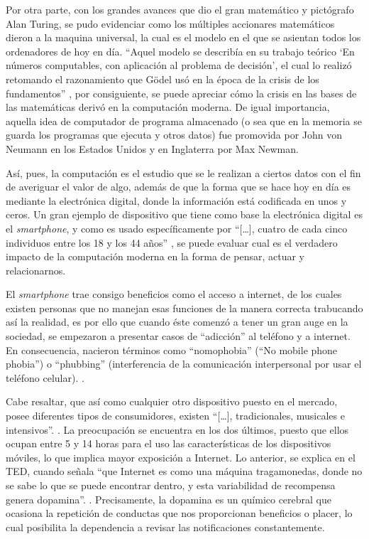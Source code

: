 \documentclass[letterpaper, 12 pt, conference]{ieeeconf}  %
\begin{document}
\begin{.}
Por otra parte, con los grandes avances que dio el gran matemático y pictógrafo Alan Turing, se pudo evidenciar como los múltiples accionares matemáticos dieron a la maquina universal, la cual es el modelo en el que se asientan todos los ordenadores de hoy en día. “Aquel modelo se describía en su trabajo teórico ‘En números computables, con aplicación al problema de decisión’, el cual lo realizó retomando el razonamiento que Gödel usó en la época de la crisis de los fundamentos” \cite{c6}, por consiguiente, se puede apreciar cómo la crisis en las bases de las matemáticas derivó en la computación moderna. De igual importancia, aquella idea de computador de programa almacenado (o sea que en la memoria se guarda los programas que ejecuta y otros datos) fue promovida por John von Neumann en los Estados Unidos y en Inglaterra por Max Newman. 
\smallskip

Así, pues, la computación es el estudio que se le realizan a ciertos datos con el fin de averiguar el valor de algo, además de que la forma que se hace hoy en día es mediante la electrónica digital, donde la información está codificada en unos y ceros. Un gran ejemplo de dispositivo que tiene como base la electrónica digital es el \textit{smartphone}, y como es usado específicamente por “[…], cuatro de cada cinco individuos entre los 18 y los 44 años” \cite{c5}, se puede evaluar cual es el verdadero impacto de la computación moderna en la forma de pensar, actuar y relacionarnos. 
\smallskip

El \textit{smartphone} trae consigo beneficios como el acceso a internet, de los cuales existen personas que no manejan esas funciones de la manera correcta trabucando así la realidad, es por ello que cuando éste comenzó a tener un gran auge en la sociedad, se empezaron a presentar casos de “adicción” al teléfono y a internet. En consecuencia, nacieron términos como “nomophobia” (“No mobile phone phobia”) o “phubbing” (interferencia de la comunicación interpersonal por usar el teléfono celular). \cite{c13}. 
\smallskip

Cabe resaltar, que así como cualquier otro dispositivo puesto en el mercado, posee diferentes tipos de consumidores, existen “[…], tradicionales, musicales e intensivos”. \cite{c14}. La preocupación se encuentra en los dos últimos, puesto que ellos ocupan entre 5 y 14 horas para el uso las características de los dispositivos móviles, lo que implica mayor exposición a Internet. Lo anterior, se explica en el TED, cuando señala “que Internet es como una máquina tragamonedas, donde no se sabe lo que se puede encontrar dentro, y esta variabilidad de recompensa genera dopamina”. \cite{c15}. Precisamente, la dopamina es un químico cerebral que ocasiona la repetición de conductas que nos proporcionan beneficios o placer, lo cual posibilita la dependencia a revisar las notificaciones constantemente. 
\smallskip


\end{.}
\end{document}
